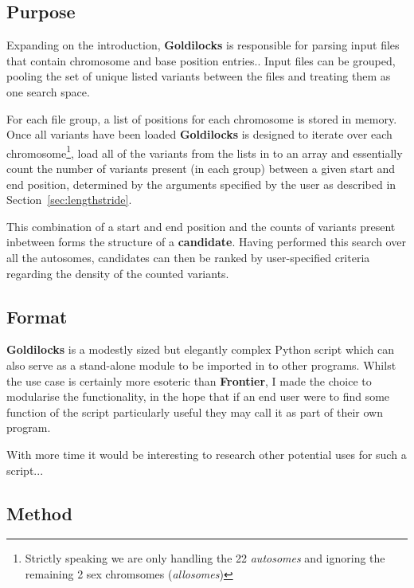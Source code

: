 \subsection{Purpose}
\label{sec:goldilocks-purpose}

Expanding on the introduction, \textbf{Goldilocks} is responsible for parsing
input files that contain chromosome and base
position entries.. 
Input files can be grouped, pooling the set of unique listed
variants between the files and treating them as one search space.

For each file group, a list of positions for each chromosome is stored in
memory. Once all variants have been loaded \textbf{Goldilocks} is designed to
iterate over each chromosome\footnote{Strictly speaking we are only handling the
22 \textit{autosomes} and ignoring the remaining 2 sex chromsomes
(\textit{allosomes})}, load all of the variants from the lists in to an array
and essentially count the number of variants present (in each group) between a
given start and end position, determined by the arguments specified by the user
as described in Section~\ref{sec:lengthstride}.

This combination of a start and end position and the counts of variants present
inbetween forms the structure of a \textbf{candidate}. Having performed this
search over all the autosomes, candidates can then be ranked by user-specified
criteria regarding the density of the counted variants.



\subsection{Format}

\textbf{Goldilocks} is a modestly sized but elegantly complex Python script
which can also serve as a stand-alone module to be imported in to other
programs. Whilst the use case is certainly more esoteric than \textbf{Frontier},
I made the choice to modularise the functionality, in the hope that if an end
user were to find some function of the script particularly useful they may call
it as part of their own program.

With more time it would be interesting to research other potential uses for such
a script...


\subsection{Method}

